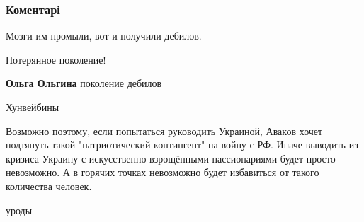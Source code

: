  
 
 
 
 
\subsubsection{Коментарі}

\begin{itemize} %
Мозги им промыли, вот и получили дебилов.

Потерянное поколение!

\begin{itemize} %
\textbf{Ольга Ольгина} поколение дебилов
\end{itemize} %

Хунвейбины


Возможно поэтому, если попытаться руководить Украиной, Аваков хочет подтянуть
такой "патриотический контингент" на войну с РФ. Иначе выводить из кризиса
Украину с искусственно взрощёнными пассионариями будет просто невозможно. А в
горячих точках невозможно будет избавиться от такого количества человек.

уроды

\end{itemize} %
